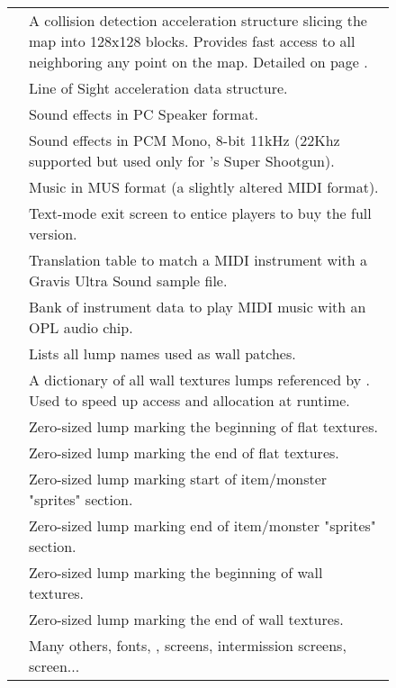 \begin{figure}[H]
\begin{tabularx}{\textwidth}{ L{0.2}  L{0.8}}
   & A collision detection acceleration structure slicing the map into 128x128 blocks. Provides fast access to all  neighboring any point on the map. Detailed on page \pageref{blockmapdetails}. \\
   &  Line of Sight acceleration data structure.\\
  \toprule
   &  Sound effects in PC Speaker format.\\
   &  Sound effects in PCM Mono, 8-bit 11kHz (22Khz supported but used only for \doomii{}'s Super Shootgun).\\
   & Music in MUS format (a slightly altered MIDI format).\\
  \toprule
   & Text-mode exit screen to entice players to buy the full version. \\
   & Translation table to match a MIDI instrument with a Gravis Ultra Sound sample file.\\
   &  Bank of instrument data to play MIDI music with an OPL audio chip.\\
   &  Lists all lump names used as wall patches.\\
   &  A dictionary of all wall textures lumps referenced by . Used to speed up access and allocation at runtime.\\  
   &  Zero-sized lump marking the beginning of flat textures.\\  
   &   Zero-sized lump marking the end of flat textures.\\  
   & Zero-sized lump marking start of item/monster "sprites" section. \\  
   & Zero-sized lump marking end of item/monster "sprites" section. \\  
   & Zero-sized lump marking the beginning of wall textures.\\
   & Zero-sized lump marking the end of wall textures.\\
   &  Many others, fonts, ,  screens, intermission screens,  screen... \\  
   \toprule
\end{tabularx}
\end{figure}
\par
\pagebreak






